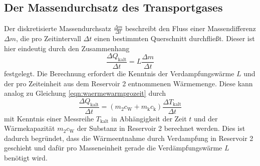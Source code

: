 \subsection{Der Massendurchsatz des Transportgases}
Der diskretisierte Massendurchsatz $\frac{\Delta m}{\Delta t}$ beschreibt den Fluss einer Massendifferenz $\Delta m$, die
pro Zeitintervall $\Delta t$ einen bestimmten Querschnitt durchfließt.
Dieser ist hier eindeutig durch den Zusammenhang
\begin{equation}
  \frac{\Delta Q_\text{kalt}}{\Delta t} = L \frac{\Delta m}{\Delta t}
  \label{eqn:massendurchsatz}
\end{equation}
festgelegt. Die Berechnung erfordert die Kenntnis der Verdampfungswärme $L$ und
der pro Zeiteinheit aus dem Reservoir 2 entnommenen Wärmemenge. Diese kann analog zu
Gleichung \eqref{eqn:waermewarmprozeit} durch
\begin{equation}
  \frac{\Delta Q_\text{kalt}}{\Delta t} = (m_2 c_\text{W} + m_\text{k} c_\text{k}) \frac{\Delta T_\text{kalt}}{\Delta t}
  \label{eqn:waermekaltprozeit}
\end{equation}
mit Kenntnis einer Messreihe $T_\text{kalt}$ in Abhängigkeit der Zeit $t$ und
der Wärmekapazität $m_2 c_\text{W}$ der Substanz in Reservoir 2 berechnet werden.
Dies ist dadurch begründet, dass die Wärmeentnahme durch Verdampfung in Reservoir 2 geschieht
und dafür pro Masseneinheit gerade die Verdämpfungswärme $L$ benötigt wird.
